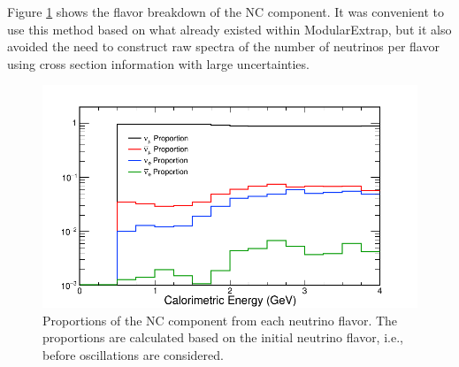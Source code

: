 \n Figure \ref{fig:NCProportions} shows the flavor breakdown of the NC component. It was convenient to use this method based on what already existed within ModularExtrap, but it also avoided the need to construct raw spectra of the number of neutrinos per flavor using cross section information with large uncertainties.
\begin{figure}[htb]
  \centering
  \includegraphics[width=.47\textwidth]{figures/Extrap/NCProportions.png}
  \caption[NC Component Flavor Proportions]{Proportions of the NC component from each neutrino flavor. The proportions are calculated based on the initial neutrino flavor, i.e., before oscillations are considered.}
  \label{fig:NCProportions}
\end{figure}


